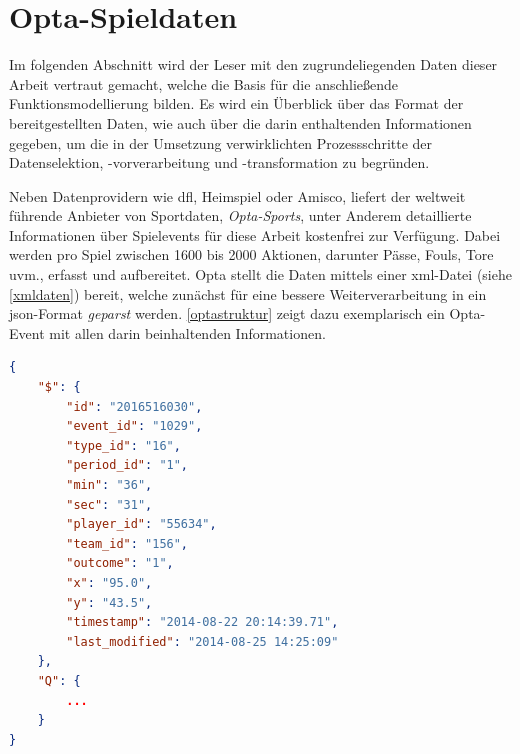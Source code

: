 \section{Opta-Spieldaten}
\label{opta}
Im folgenden Abschnitt wird der Leser mit den zugrundeliegenden Daten dieser Arbeit vertraut gemacht, welche die Basis für die anschließende Funktionsmodellierung bilden. Es wird ein Überblick über das Format der bereitgestellten Daten, wie auch über die darin enthaltenden Informationen gegeben, um die in der Umsetzung verwirklichten Prozessschritte der Datenselektion, -vorverarbeitung und -transformation zu begründen.

Neben Datenprovidern wie \gls{dfl}, Heimspiel oder Amisco, liefert der weltweit führende Anbieter von Sportdaten, \textit{Opta-Sports}, unter Anderem detaillierte Informationen über Spielevents für diese Arbeit kostenfrei zur Verfügung. Dabei werden pro Spiel zwischen 1600 bis 2000 Aktionen, darunter Pässe, Fouls, Tore uvm., erfasst und aufbereitet. Opta stellt die Daten mittels einer \gls{xml}-Datei (siehe \vref{xmldaten}) bereit, welche zunächst für eine bessere Weiterverarbeitung in ein \gls{json}-Format \textit{geparst} werden. \vref{optastruktur} zeigt dazu exemplarisch ein Opta-Event mit allen darin beinhaltenden Informationen.
\newline

\begin{lstlisting}[caption=\captionListingText,language=json,xleftmargin=5mm,label=optastruktur] 
{
	"$": {
		"id": "2016516030",
		"event_id": "1029",
		"type_id": "16",
		"period_id": "1",
		"min": "36",
		"sec": "31",
		"player_id": "55634",
		"team_id": "156",
		"outcome": "1",
		"x": "95.0",
		"y": "43.5",
		"timestamp": "2014-08-22 20:14:39.71",
		"last_modified": "2014-08-25 14:25:09"
	},
	"Q": {
	    ...
	}
}
\end{lstlisting}


